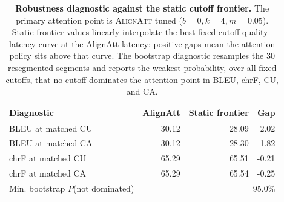 \begin{table}[t]
\centering
\small
\setlength{\tabcolsep}{4pt}
\begin{tabular}{l r r r}
\toprule
Diagnostic & AlignAtt & Static frontier & Gap \\
\midrule
BLEU at matched CU & 30.12 & 28.09 & 2.02 \\
BLEU at matched CA & 30.12 & 28.30 & 1.82 \\
chrF at matched CU & 65.29 & 65.51 & -0.21 \\
chrF at matched CA & 65.29 & 65.54 & -0.25 \\
\midrule
Min. bootstrap $P$(not dominated) & \multicolumn{3}{r}{95.0\%} \\
\bottomrule
\end{tabular}
\caption{\textbf{Robustness diagnostic against the static cutoff frontier.} The primary attention point is \textsc{AlignAtt} tuned ($b=0,k=4,m=0.05$). Static-frontier values linearly interpolate the best fixed-cutoff quality--latency curve at the AlignAtt latency; positive gaps mean the attention policy sits above that curve. The bootstrap diagnostic resamples the 30 resegmented segments and reports the weakest probability, over all fixed cutoffs, that no cutoff dominates the attention point in BLEU, chrF, CU, and CA.}
\label{tab:mt-cutoff-frontier-gap}
\end{table}
